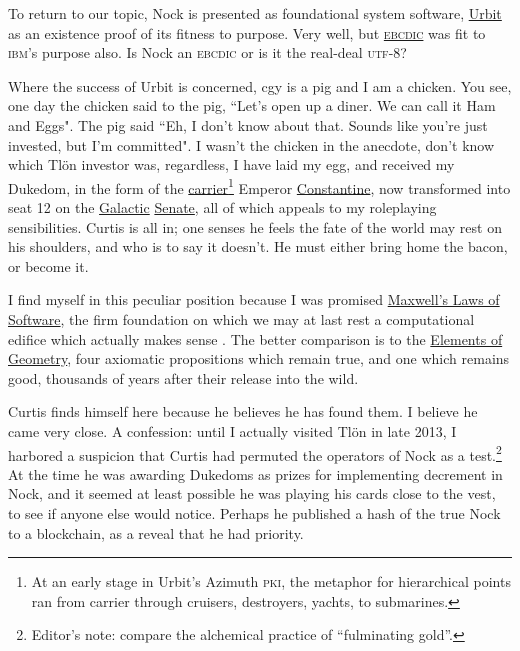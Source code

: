\documentclass[twoside]{article}
\begin{document}
To return to our topic, Nock is presented as foundational system software, \href{https://urbit.org}{Urbit} as an existence proof of its fitness to purpose. Very well, but \href{https://en.wikipedia.org/wiki/EBCDIC}{\textsc{ebcdic}} was fit to \textsc{ibm}'s purpose also. Is Nock an \textsc{ebcdic} or is it the real-deal \textsc{utf}-8?

Where the success of Urbit is concerned, cgy is a pig and I am a chicken. You see, one day the chicken said to the pig, ``Let's open up a diner. We can call it Ham and Eggs". The pig said ``Eh, I don't know about that. Sounds like you're just invested, but I'm committed". I wasn't the chicken in the anecdote, don't know which Tlön investor was, regardless, I have laid my egg, and received my Dukedom, in the form of the \href{https://en.wikipedia.org/wiki/Aircraft_carrier}{carrier}\footnote{At an early stage in Urbit's Azimuth \textsc{pki}, the metaphor for hierarchical points ran from carrier through cruisers, destroyers, yachts, to submarines.} Emperor \href{https://en.wikipedia.org/wiki/Constantine_(disambiguation)}{Constantine}, now transformed into seat 12 on the \href{https://urbit.org/~~/posts/constitution/}{Galactic} \href{https://en.wikipedia.org/wiki/Roman_Senate}{Senate}, all of which appeals to my roleplaying sensibilities. Curtis is all in; one senses he feels the fate of the world may rest on his shoulders, and who is to say it doesn't. He must either bring home the bacon, or become it.

I find myself in this peculiar position because I was promised \href{https://moronlab.blogspot.com/}{Maxwell's Laws of Software}, the firm foundation on which we may at last rest a computational edifice which actually makes sense \citep{Yarvin2010d}. The better comparison is to the \href{https://en.wikipedia.org/wiki/Euclid%27s_Elements}{Elements of Geometry}, four axiomatic propositions which remain true, and one which remains good, thousands of years after their release into the wild.

Curtis finds himself here because he believes he has found them. I believe he came very close. A confession: until I actually visited Tlön in late 2013, I harbored a suspicion that Curtis had permuted the operators of Nock as a test.\footnote{Editor's note:  compare the alchemical practice of ``fulminating gold''.} At the time he was awarding Dukedoms as prizes for implementing decrement in Nock, and it seemed at least possible he was playing his cards close to the vest, to see if anyone else would notice. Perhaps he published a hash of the true Nock to a blockchain, as a reveal that he had priority.
\end{document}
